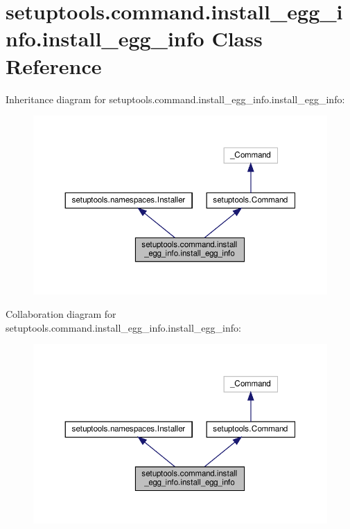 \hypertarget{classsetuptools_1_1command_1_1install__egg__info_1_1install__egg__info}{}\section{setuptools.\+command.\+install\+\_\+egg\+\_\+info.\+install\+\_\+egg\+\_\+info Class Reference}
\label{classsetuptools_1_1command_1_1install__egg__info_1_1install__egg__info}


Inheritance diagram for setuptools.\+command.\+install\+\_\+egg\+\_\+info.\+install\+\_\+egg\+\_\+info\+:
\nopagebreak
\begin{figure}[H]
\begin{center}
\leavevmode
\includegraphics[width=350pt]{classsetuptools_1_1command_1_1install__egg__info_1_1install__egg__info__inherit__graph}
\end{center}
\end{figure}


Collaboration diagram for setuptools.\+command.\+install\+\_\+egg\+\_\+info.\+install\+\_\+egg\+\_\+info\+:
\nopagebreak
\begin{figure}[H]
\begin{center}
\leavevmode
\includegraphics[width=350pt]{classsetuptools_1_1command_1_1install__egg__info_1_1install__egg__info__coll__graph}
\end{center}
\end{figure}
